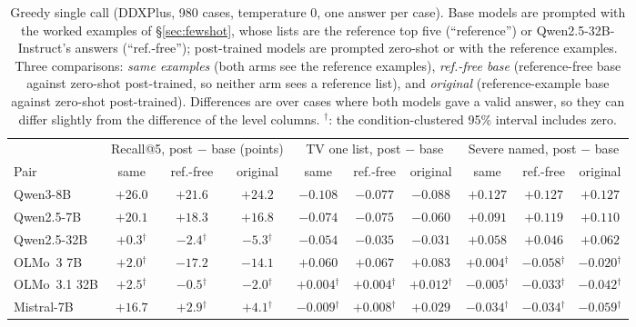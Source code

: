 \documentclass[11pt]{article}
\begin{document}
\begin{table}[t]
\medskip
\begin{adjustbox}{max width=\linewidth}
\begin{tabular}{lccccccccc}
\toprule
 & \multicolumn{3}{c}{Recall@5, post $-$ base (points)} & \multicolumn{3}{c}{TV one list, post $-$ base} & \multicolumn{3}{c}{Severe named, post $-$ base} \\
Pair & same & ref.-free & original & same & ref.-free & original & same & ref.-free & original \\
\midrule
Qwen3-8B & $+26.0$ & $+21.6$ & $+24.2$ & $-0.108$ & $-0.077$ & $-0.088$ & $+0.127$ & $+0.127$ & $+0.127$ \\
Qwen2.5-7B & $+20.1$ & $+18.3$ & $+16.8$ & $-0.074$ & $-0.075$ & $-0.060$ & $+0.091$ & $+0.119$ & $+0.110$ \\
Qwen2.5-32B & $+0.3$$^{\dagger}$ & $-2.4$$^{\dagger}$ & $-5.3$$^{\dagger}$ & $-0.054$ & $-0.035$ & $-0.031$ & $+0.058$ & $+0.046$ & $+0.062$ \\
OLMo~3 7B & $+2.0$$^{\dagger}$ & $-17.2$ & $-14.1$ & $+0.060$ & $+0.067$ & $+0.083$ & $+0.004$$^{\dagger}$ & $-0.058$$^{\dagger}$ & $-0.020$$^{\dagger}$ \\
OLMo~3.1 32B & $+2.5$$^{\dagger}$ & $-0.5$$^{\dagger}$ & $-2.0$$^{\dagger}$ & $+0.004$$^{\dagger}$ & $+0.004$$^{\dagger}$ & $+0.012$$^{\dagger}$ & $-0.005$$^{\dagger}$ & $-0.033$$^{\dagger}$ & $-0.042$$^{\dagger}$ \\
Mistral-7B & $+16.7$ & $+2.9$$^{\dagger}$ & $+4.1$$^{\dagger}$ & $-0.009$$^{\dagger}$ & $+0.008$$^{\dagger}$ & $+0.029$ & $-0.034$$^{\dagger}$ & $-0.034$$^{\dagger}$ & $-0.059$$^{\dagger}$ \\
\bottomrule
\end{tabular}
\end{adjustbox}
\caption{Greedy single call (DDXPlus, 980 cases, temperature 0, one answer per case). Base models are prompted with the worked examples of \S\ref{sec:fewshot}, whose lists are the reference top five (``reference'') or Qwen2.5-32B-Instruct's answers (``ref.-free''); post-trained models are prompted zero-shot or with the reference examples. Three comparisons: \emph{same examples} (both arms see the reference examples), \emph{ref.-free base} (reference-free base against zero-shot post-trained, so neither arm sees a reference list), and \emph{original} (reference-example base against zero-shot post-trained). Differences are over cases where both models gave a valid answer, so they can differ slightly from the difference of the level columns. $^{\dagger}$: the condition-clustered 95\% interval includes zero.}
\label{tab:greedy}
\end{table}
\end{document}
